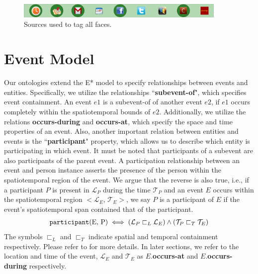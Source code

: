 \begin{figure}[h]
\centering
\includegraphics[width=0.9\textwidth]{media/chapter4/stacktrace/vldb-source-3.png}
\caption{Sources used to tag all faces.}
\label{fig:vldb-network-3}
\end{figure}


\section{Event Model}
Our ontologies extend the E* model\cite{gupta2011managing} to specify relationships between events and entities. Specifically, we utilize the relationships ``\textbf{subevent-of}", which specifies event containment. An event $e1$ is a subevent-of of another event $e2$, if $e1$ occurs completely within the spatiotemporal bounds of $e2$. Additionally, we utilize the relations \textbf{occurs-during} and \textbf{occurs-at}, which specify the space and time properties of an event. Also, another important relation between entities and events is the ``\textbf{participant}" property, which allows us to describe which entity is participating in which event. It must be noted that participants of a subevent are also participants of the parent event. A participation relationship between an event and person instance asserts the presence of the person within the spatiotemporal region of the event. We argue that the reverse is also true, i.e., if a participant $P$ is present in $\mathcal{L}_P$ during the time $\mathcal{T}_P$ and an event $E$ occurs within the spatiotemporal region $<\mathcal{L}_E$, $\mathcal{T}_E>$, we say $P$ is a participant of $E$ if the event's spatiotemporal span contained that of the participant.
\begin{equation}
\label{eq:participation-region}
\begin{aligned}
\text{\texttt{participant}(E, P)} \iff (\mathcal{L}_P \sqsubset_L \mathcal{L}_E) \wedge (\mathcal{T}_P \sqsubset_T \mathcal{T}_E)
\end{aligned}
\end{equation}
The symbols $\sqsubset_L$ and $\sqsubset_T$ indicate spatial and temporal containment respectively. Please refer to \cite{gupta2011managing} for more details. In later sections, we refer to the location and time of the event, $\mathcal{L}_E$ and $\mathcal{T}_E$ as $E$.\textbf{occurs-at} and $E.$\textbf{occurs-during} respectively. 

